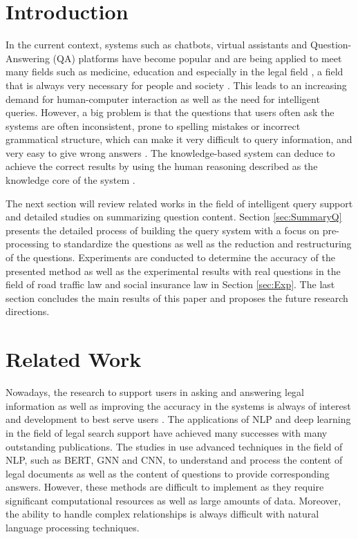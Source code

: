 \documentclass{IOS-Book-Article}
\begin{document}
\section{Introduction}
\label{sec:Intro}

In the current context, systems such as chatbots, virtual assistants and Question-Answering (QA) platforms have become popular and are being applied to meet many fields such as medicine, education and especially in the legal field \cite{r11,r12}, a field that is always very necessary for people and society \cite{r13,r14}. This leads to an increasing demand for human-computer interaction as well as the need for intelligent queries. However, a big problem is that the questions that users often ask the systems are often inconsistent, prone to spelling mistakes or incorrect grammatical structure, which can make it very difficult to query information, and very easy to give wrong answers \cite{r15}. The knowledge-based system can deduce to achieve the correct results by using the human reasoning described as the knowledge core of the system \cite{r28}.

The next section will review related works in the field of intelligent query support and detailed studies on summarizing question content. Section \ref{sec:SummaryQ} presents the detailed process of building the query system with a focus on pre-processing to standardize the questions as well as the reduction and restructuring of the questions. Experiments are conducted to determine the accuracy of the presented method as well as the experimental results with real questions in the field of road traffic law and social insurance law in Section \ref{sec:Exp}. The last section concludes the main results of this paper and proposes the future research directions.

\section{Related Work}
\label{sec:RW}

Nowadays, the research to support users in asking and answering legal information as well as improving the accuracy in the systems is always of interest and development to best serve users \cite{r16,r17}. The applications of NLP and deep learning in the field of legal search support have achieved many successes with many outstanding publications. The studies in \cite{r6,r7,r8} use advanced techniques in the field of NLP, such as BERT, GNN and CNN, to understand and process the content of legal documents as well as the content of questions to provide corresponding answers. However, these methods are difficult to implement as they require significant computational resources as well as large amounts of data. Moreover, the ability to handle complex relationships is always difficult with natural language processing techniques. 
\end{document}
